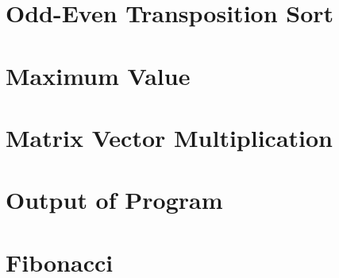 \documentclass[11pt]{article}
\begin{document}
\section{Odd-Even Transposition Sort}
\label{sec:orga51c53c}

\section{Maximum Value}
\label{sec:orgde0f2bb}

\section{Matrix Vector Multiplication}
\label{sec:orge73096b}

\section{Output of Program}
\label{sec:org415912c}

\section{Fibonacci}
\label{sec:org7421ce0}
\end{document}
